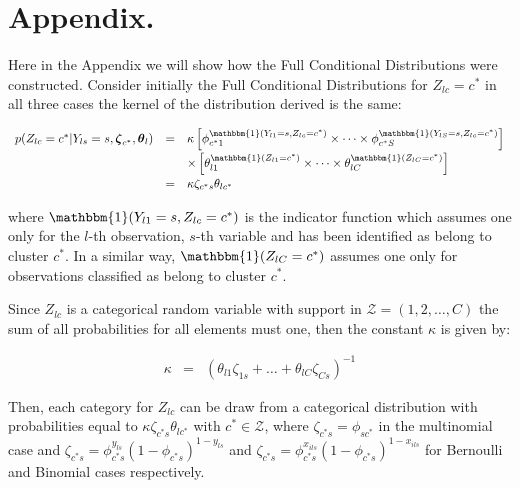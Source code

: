 \documentclass[article]{jss}
\newcommand{\Za}{\mathcal{Z}}
\begin{document}
\section*{Appendix.}\label{appendix.}

Here in the Appendix we will show how the Full Conditional Distributions
were constructed. Consider initially the Full Conditional Distributions
for \(Z_{lc}=c^{*}\) in all three cases the kernel of the distribution
derived is the same:

\begin{equation*}
\begin{array}{lll}
p(Z_{lc}=c^{*}|Y_{ls}=s,\boldsymbol\zeta_{c^{*}},\boldsymbol\theta_{l})&=&\kappa\left[\phi_{c^{*}1}^{\mathbbm{1}(Y_{l1}=s,Z_{lc}=c^{*})}\times\dots\times \phi_{c^{*}S}^{\mathbbm{1}(Y_{lS}=s,Z_{lc}=c^{*})}\right]\\[.5em]
&&\times\left[\theta_{l1}^{\mathbbm{1}(Z_{l1}=c^{*})}\times\dots\times\theta_{lC}^{\mathbbm{1}(Z_{lC}=c^{*})}\right]\\[.5em]
&=&\kappa\zeta_{c^{*}s}\theta_{lc^{*}}
\end{array}
\label{ap:eq0001} 
\end{equation*}

\noindent where \(\mathbbm{1}(Y_{l1}=s,Z_{lc}=c^{*})\) is the indicator
function which assumes one only for the \(l\)-th observation, \(s\)-th
variable and has been identified as belong to cluster \(c^{*}\). In a
similar way, \(\mathbbm{1}(Z_{lC}=c^{*})\) assumes one only for
observations classified as belong to cluster \(c^{*}\).

Since \(Z_{lc}\) is a categorical random variable with support in
\(\Za=(1,2,\dots,C)\) the sum of all probabilities for all elements must
one, then the constant \(\kappa\) is given by:

\begin{equation*}
\begin{array}{lll}
\kappa&=&\left(\theta_{l1}\zeta_{1s}+\dots+\theta_{lC}\zeta_{Cs}\right)^{-1}
\end{array}
\label{ap:eq0002} 
\end{equation*}

Then, each category for \(Z_{lc}\) can be draw from a categorical
distribution with probabilities equal to
\(\kappa\zeta_{c^{*}s}\theta_{lc^{*}}\) with \(c^{*} \in \Za\), where
\(\zeta_{c^{*}s}=\phi_{sc^{*}}\) in the multinomial case and
\(\zeta_{c^{*}s}=\phi_{c^{*}s}^{y_{ls}}(1-\phi_{c^{*}s})^{1-y_{ls}}\)
and
\(\zeta_{c^{*}s}=\phi_{c^{*}s}^{x_{ils}}(1-\phi_{c^{*}s})^{1-x_{ils}}\)
for Bernoulli and Binomial cases respectively.
\end{document}
